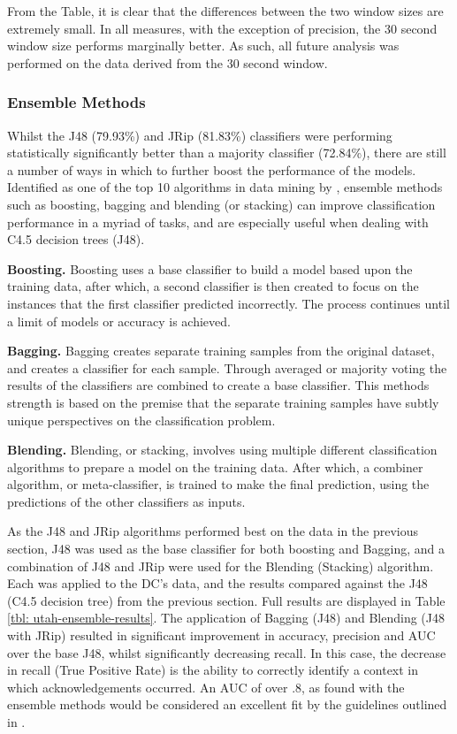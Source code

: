 From the Table, it is clear that the differences between the two window sizes are extremely small. In all measures, with the exception of precision, the 30 second window size performs marginally better. As such, all future analysis was performed on the data derived from the 30 second window.

\subsubsection{Ensemble Methods}
Whilst the J48 (79.93\%) and JRip (81.83\%) classifiers were performing statistically significantly better than a majority classifier (72.84\%), there are still a number of ways in which to further boost the performance of the models. Identified as one of the top 10 algorithms in data mining by \citeauthor{Wu2007} \cite{Wu2007}, ensemble methods such as boosting, bagging and blending (or stacking) can improve classification performance in a myriad of tasks, and are especially useful when dealing with C4.5 decision trees (J48).

\textbf{Boosting.}
Boosting uses a base classifier to build a model based upon the training data, after which, a second classifier is then created to focus on the instances that the first classifier predicted incorrectly. The process continues until a limit of models or accuracy is achieved.

\textbf{Bagging.}
Bagging creates separate training samples from the original dataset, and creates a classifier for each sample. Through averaged or majority voting the results of the classifiers are combined to create a base classifier. This methods strength is based on the premise that the separate training samples have subtly unique perspectives on the classification problem. 

\textbf{Blending.}
Blending, or stacking, involves using multiple different classification algorithms to prepare a model on the training data. After which, a combiner algorithm, or meta-classifier, is trained to make the final prediction, using the predictions of the other classifiers as inputs.

As the J48 and JRip algorithms performed best on the data in the previous section, J48 was used as the base classifier for both boosting and Bagging, and a combination of J48 and JRip were used for the Blending (Stacking) algorithm. Each was applied to the DC's data, and the results compared against the J48 (C4.5 decision tree) from the previous section. Full results are displayed in Table \ref{tbl: utah-ensemble-results}. The application of Bagging (J48) and Blending (J48 with JRip) resulted in significant improvement in accuracy, precision and AUC over the base J48, whilst significantly decreasing recall. In this case, the decrease in recall (True Positive Rate) is the ability to correctly identify a context in which acknowledgements occurred. An AUC of over .8, as found with the ensemble methods would be considered an excellent fit by the guidelines outlined in \cite{Tape}.

